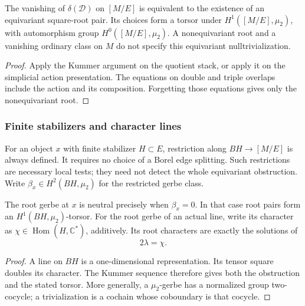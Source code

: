 \begin{proposition}
\label{prop:free-e-borel-nulltrivialization-criterion}
The vanishing of \(\delta(\mathscr D)\) on \([M/E]\) is equivalent
to the existence of an equivariant square-root pair.  Its choices form
a torsor under \(H^1([M/E],\mu_2)\), with automorphism group
\(H^0([M/E],\mu_2)\).  A nonequivariant root and a vanishing ordinary
class on \(M\) do not specify this equivariant nulltrivialization.
\end{proposition}
\begin{proof}
Apply the Kummer argument on the quotient stack, or apply it on the
simplicial action presentation.  The equations on double and triple
overlaps include the action and its composition.  Forgetting those
equations gives only the nonequivariant root.
\end{proof}

\subsubsection*{Finite stabilizers and character lines}

For an object \(x\) with finite stabilizer \(H\subset E\), restriction
along \(BH\to[M/E]\) is always defined.  It requires no choice of a
Borel edge splitting.  Such restrictions are necessary local tests;
they need not detect the whole equivariant obstruction.
Write \(\beta_x\in H^2(BH,\mu_2)\) for the restricted gerbe class.

\begin{proposition}
\label{prop:finite-stabilizer-beta-class-criterion}
\label{prop:finite-stabilizer-beta-vanishing-criterion}
\label{prop:finite-stabilizer-beta-nulltrivialization-criterion}
The root gerbe at \(x\) is neutral precisely when \(\beta_x=0\).
In that case root pairs form an \(H^1(BH,\mu_2)\)-torsor.
For the root gerbe of an actual line, write its character as
\(\chi\in\operatorname{Hom}(H,\mathbb C^*)\), additively.
Its root characters are exactly the solutions of
\[
 2\lambda=\chi.
\]
\end{proposition}
\begin{proof}
A line on \(BH\) is a one-dimensional representation.  Its tensor
square doubles its character.  The Kummer sequence therefore gives
both the obstruction and the stated torsor.  More generally, a
\(\mu_2\)-gerbe has a normalized group two-cocycle; a trivialization
is a cochain whose coboundary is that cocycle.
\end{proof}

